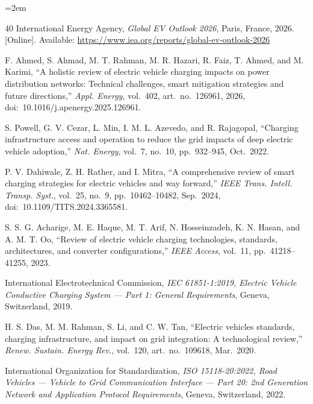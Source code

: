 \documentclass{ieeeaccess}
\begin{document}
    \begingroup
    \scriptsize
    \sloppy
    \emergencystretch=2em
    \begin{thebibliography}{40}
    \setlength{\itemsep}{0pt}\setlength{\parsep}{0pt}\setlength{\parskip}{0pt}
                 International Energy Agency, \textit{Global EV Outlook 2026}, Paris, France, 2026. [Online]. Available: \url{https://www.iea.org/reports/global-ev-outlook-2026}

         F. Ahmed, S. Ahmad, M. T. Rahman, M. R. Hazari, R. Faiz, T. Ahmed, and M. Karimi, ``A holistic review of electric vehicle charging impacts on power distribution networks: Technical challenges, smart mitigation strategies and future directions,'' \textit{Appl. Energy}, vol.~402, art.~no.~126961, 2026, doi:~10.1016/j.apenergy.2025.126961.

         S. Powell, G. V. Cezar, L. Min, I. M. L. Azevedo, and R. Rajagopal, ``Charging infrastructure access and operation to reduce the grid impacts of deep electric vehicle adoption,'' \textit{Nat. Energy}, vol.~7, no.~10, pp.~932--945, Oct.~2022.

         P. V. Dahiwale, Z. H. Rather, and I. Mitra, ``A comprehensive review of smart charging strategies for electric vehicles and way forward,'' \textit{IEEE Trans. Intell. Transp. Syst.}, vol.~25, no.~9, pp.~10462--10482, Sep.~2024, doi:~10.1109/TITS.2024.3365581.

         S. S. G. Acharige, M. E. Haque, M. T. Arif, N. Hosseinzadeh, K. N. Hasan, and A. M. T. Oo, ``Review of electric vehicle charging technologies, standards, architectures, and converter configurations,'' \textit{IEEE Access}, vol.~11, pp.~41218--41255, 2023.

         International Electrotechnical Commission, \textit{IEC 61851-1:2019, Electric Vehicle Conductive Charging System --- Part 1: General Requirements}, Geneva, Switzerland, 2019.

         H. S. Das, M. M. Rahman, S. Li, and C. W. Tan, ``Electric vehicles standards, charging infrastructure, and impact on grid integration: A technological review,'' \textit{Renew. Sustain. Energy Rev.}, vol.~120, art.~no.~109618, Mar.~2020.

         International Organization for Standardization, \textit{ISO 15118-20:2022, Road Vehicles --- Vehicle to Grid Communication Interface --- Part 20: 2nd Generation Network and Application Protocol Requirements}, Geneva, Switzerland, 2022.


\end{thebibliography}
\end{document}
